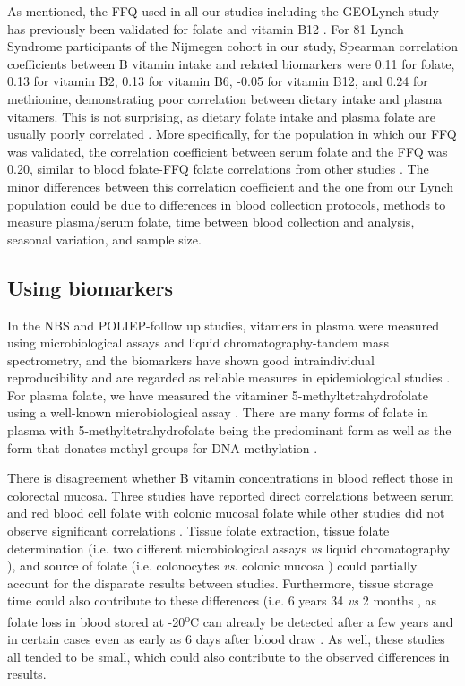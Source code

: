 \noindent As mentioned, the FFQ used in all our studies including the GEOLynch study has previously been validated for folate and vitamin B12 \cite{c717}. For 81 Lynch Syndrome participants of the Nijmegen cohort in our study, Spearman correlation coefficients between B vitamin intake and related biomarkers were 0.11 for folate, 0.13 for vitamin B2, 0.13 for vitamin B6, -0.05 for vitamin B12, and 0.24 for methionine, demonstrating poor correlation between dietary intake and plasma vitamers. This is not surprising, as dietary folate intake and plasma folate are usually poorly correlated \cite{c722,c730,c731}. More specifically, for the population in which our FFQ was validated, the correlation coefficient between serum folate and the FFQ was 0.20, similar to blood folate-FFQ folate correlations from other studies \cite{c722,c730,c731}. The minor differences between this correlation coefficient and the one from our Lynch population could be due to differences in blood collection protocols, methods to measure plasma/serum folate, time between blood collection and analysis, seasonal variation, and sample size.

\subsection{Using biomarkers} %
\noindent In the NBS and POLIEP-follow up studies, vitamers in plasma were measured using microbiological assays and liquid chromatography-tandem mass spectrometry, and the biomarkers have shown good intraindividual reproducibility and are regarded as reliable measures in epidemiological studies \cite{c732}. For plasma folate, we have measured the vitaminer 5-methyltetrahydrofolate using a well-known microbiological assay \cite{c733}. There are many forms of folate in plasma with 5-methyltetrahydrofolate being the predominant form as well as the form that donates methyl groups for DNA methylation \cite{c734}.

\noindent There is disagreement whether B vitamin concentrations in blood reflect those in colorectal mucosa. Three studies have reported direct correlations between serum and red blood cell folate with colonic mucosal folate \cite{c735,c736,c737} while other studies did not observe significant correlations \cite{c734,c738,c739}. Tissue folate extraction, tissue folate determination (i.e. two different microbiological assays \cite{c736,c739} \emph{vs} liquid chromatography \cite{c734}), and source of folate (i.e. colonocytes \cite{c738,c739} \emph{vs}. colonic mucosa \cite{c734,c735,c736}) could partially account for the disparate results between studies. Furthermore, tissue storage time could also contribute to these differences (i.e. 6 years 34 \emph{vs} 2 months \cite{c736}, as folate loss in blood stored at -20\textsuperscript{o}C can already be detected after a few years \cite{c740,c741} and in certain cases even as early as 6 days after blood draw \cite{c742}. As well, these studies all tended to be small, which could also contribute to the observed differences in results.

